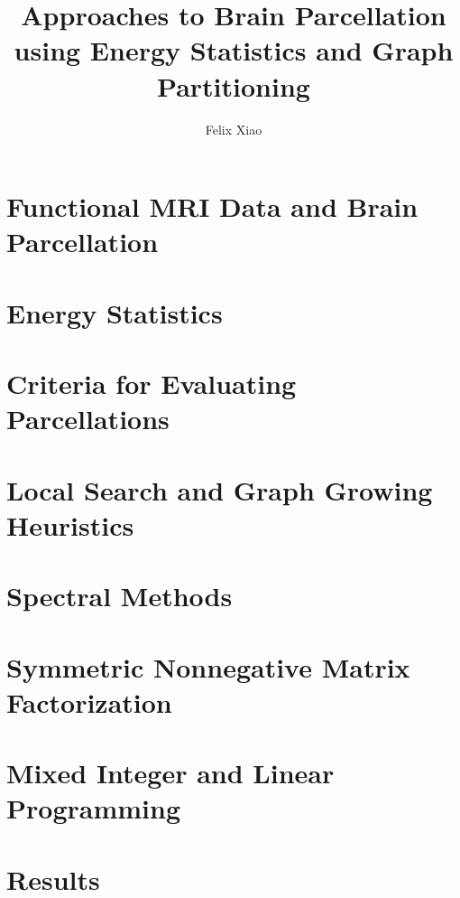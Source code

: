 \documentclass[12pt,lot,lof]{puthesis_undergraduate}
\title{Approaches to Brain Parcellation using Energy Statistics and Graph Partitioning}
\author{Felix Xiao}
\begin{document}
\chapter{Functional MRI Data and Brain Parcellation}


\chapter{Energy Statistics}


\chapter{Criteria for Evaluating Parcellations}


\chapter{Local Search and Graph Growing Heuristics}


\chapter{Spectral Methods}


\chapter{Symmetric Nonnegative Matrix Factorization}


\chapter{Mixed Integer and Linear Programming}


\chapter{Results}




\end{document}
